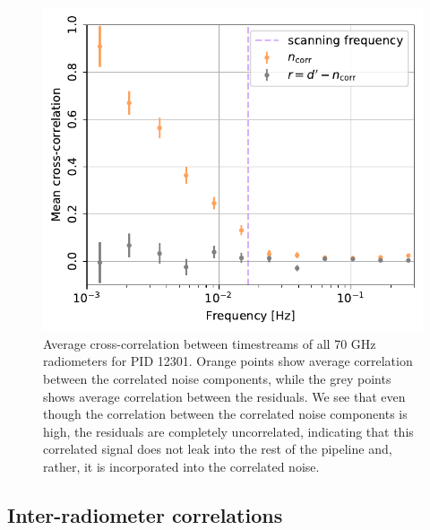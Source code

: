 \documentclass{aa}
\begin{document}
\begin{figure}
        \begin{center}
                \includegraphics[width=\linewidth]{figs/mean_crosscorr_070_12301.pdf}
        \end{center}
        \caption{Average cross-correlation between timestreams of all 70 GHz
    radiometers for PID 12301. Orange points show average correlation between
    the correlated noise components, while the grey points shows average
    correlation between the residuals. We see that even though the correlation
    between the correlated noise components is high, the residuals are completely uncorrelated, indicating that this correlated signal does not leak into the rest of the pipeline and, rather, it is incorporated into the correlated noise.
                \label{fig:mean_xcorr_70}}
\end{figure}

\subsection{Inter-radiometer correlations}
\end{document}
